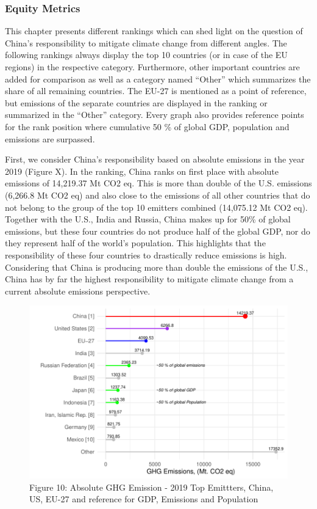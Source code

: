 \documentclass[
  12pt,
]{article}
\numberwithin{equation}{section}
\numberwithin{table}{section}
\numberwithin{figure}{section}
\begin{document}
\hypertarget{equity-metrics}{%
\subsubsection{Equity Metrics}\label{equity-metrics}}

This chapter presents different rankings which can shed light on the
question of China's responsibility to mitigate climate change from
different angles. The following rankings always display the top 10
countries (or in case of the EU regions) in the respective category.
Furthermore, other important countries are added for comparison as well
as a category named ``Other'' which summarizes the share of all
remaining countries. The EU-27 is mentioned as a point of reference, but
emissions of the separate countries are displayed in the ranking or
summarized in the ``Other'' category. Every graph also provides
reference points for the rank position where cumulative 50 \% of global
GDP, population and emissions are surpassed.

First, we consider China's responsibility based on absolute emissions in
the year 2019 (Figure X). In the ranking, China ranks on first place
with absolute emissions of 14,219.37 Mt CO2 eq. This is more than double
of the U.S. emissions (6,266.8 Mt CO2 eq) and also close to the
emissions of all other countries that do not belong to the group of the
top 10 emitters combined (14,075.12 Mt CO2 eq). Together with the U.S.,
India and Russia, China makes up for 50\% of global emissions, but these
four countries do not produce half of the global GDP, nor do they
represent half of the world's population. This highlights that the
responsibility of these four countries to drastically reduce emissions
is high. Considering that China is producing more than double the
emissions of the U.S., China has by far the highest responsibility to
mitigate climate change from a current absolute emissions perspective.

\begin{figure}
\centering
\includegraphics{Paper_files/figure-latex/unnamed-chunk-10-1.pdf}
\caption{Figure 10: Absolute GHG Emission - 2019 \textbar{} Top
Emittters, China, US, EU-27 and reference for GDP, Emissions and
Population}
\end{figure}
\end{document}
